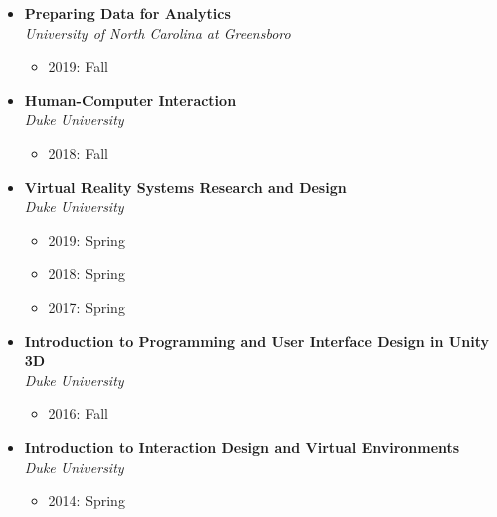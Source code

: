 \documentclass[wideaddress]{vitae}
\let\olditem\item
\def\item{\nopagebreak[4]\olditem}%
\begin{document}
\begin{itemize}
\begin{itemize}
        \end{itemize}
        \item \textbf{Preparing Data for Analytics}              						\\\textit{University of North Carolina at Greensboro}
        \begin{itemize}
            \item 2019: Fall
        \end{itemize}
        \item \textbf{Human-Computer Interaction} 				    					\\\textit{Duke University}
        \begin{itemize}
            \item 2018: Fall
        \end{itemize}
        \item \textbf{Virtual Reality Systems Research and Design}						\\\textit{Duke University}
        \begin{itemize}
            \item 2019: Spring
            \item 2018: Spring
            \item 2017: Spring
        \end{itemize}
        \item \textbf{Introduction to Programming and User Interface Design in Unity 3D}\\\textit{Duke University}
        \begin{itemize}
            \item 2016: Fall
        \end{itemize}
        \item \textbf{Introduction to Interaction Design and Virtual Environments}   	\\\textit{Duke University}
        \begin{itemize}
            \item 2014: Spring
        \end{itemize}
\end{itemize}
\end{document}
